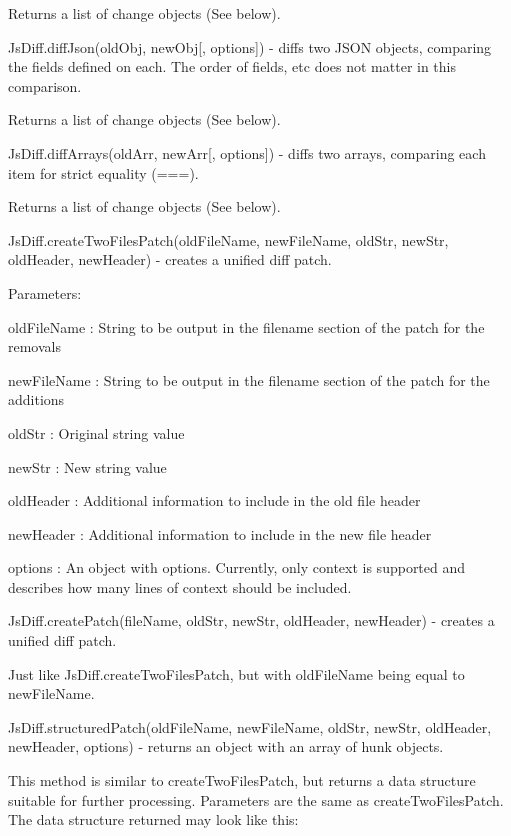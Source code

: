 \begin{DoxyItemize}
Returns a list of change objects (See below).
\item {\ttfamily Js\+Diff.\+diff\+Json(old\+Obj, new\+Obj\mbox{[}, options\mbox{]})} -\/ diffs two J\+S\+ON objects, comparing the fields defined on each. The order of fields, etc does not matter in this comparison.

Returns a list of change objects (See below).
\item {\ttfamily Js\+Diff.\+diff\+Arrays(old\+Arr, new\+Arr\mbox{[}, options\mbox{]})} -\/ diffs two arrays, comparing each item for strict equality (===).

Returns a list of change objects (See below).
\item {\ttfamily Js\+Diff.\+create\+Two\+Files\+Patch(old\+File\+Name, new\+File\+Name, old\+Str, new\+Str, old\+Header, new\+Header)} -\/ creates a unified diff patch.

Parameters\+:
\begin{DoxyItemize}
\item {\ttfamily old\+File\+Name} \+: String to be output in the filename section of the patch for the removals
\item {\ttfamily new\+File\+Name} \+: String to be output in the filename section of the patch for the additions
\item {\ttfamily old\+Str} \+: Original string value
\item {\ttfamily new\+Str} \+: New string value
\item {\ttfamily old\+Header} \+: Additional information to include in the old file header
\item {\ttfamily new\+Header} \+: Additional information to include in the new file header
\item {\ttfamily options} \+: An object with options. Currently, only {\ttfamily context} is supported and describes how many lines of context should be included.
\end{DoxyItemize}
\item {\ttfamily Js\+Diff.\+create\+Patch(file\+Name, old\+Str, new\+Str, old\+Header, new\+Header)} -\/ creates a unified diff patch.

Just like Js\+Diff.\+create\+Two\+Files\+Patch, but with old\+File\+Name being equal to new\+File\+Name.
\item {\ttfamily Js\+Diff.\+structured\+Patch(old\+File\+Name, new\+File\+Name, old\+Str, new\+Str, old\+Header, new\+Header, options)} -\/ returns an object with an array of hunk objects.

This method is similar to create\+Two\+Files\+Patch, but returns a data structure suitable for further processing. Parameters are the same as create\+Two\+Files\+Patch. The data structure returned may look like this\+:


\end{DoxyItemize}
